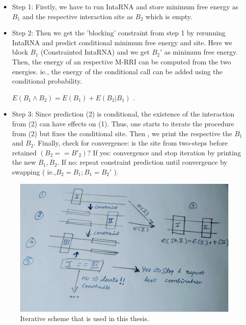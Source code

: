 \documentclass[twoside,a4paper]{report}
\begin{document}
	 
	 \begin{itemize}
	 	 
	
	 \item Step 1: Firstly, we have to run IntaRNA and store minimum free energy as $B_1$ and the respective interaction site as $B_2$ which is empty.
	 \item Step 2: Then we get the 'blocking' constraint from step 1 by rerunning IntaRNA and predict conditional minimum free energy and site. Here we block $B_1$ (Constrainted IntaRNA) and we get $B_2'$ as minimum free energy. Then, the energy of an respective M-RRI can be computed from the two energies. ie., the energy of the conditional call can be added using the conditional probability.\\
	 \begin{center}
	 	 $E(B_1 \land B_2) = E(B_1) + E(B_2 | B_1)$ .
	 \end{center}
	 
	 \item Step 3: Since prediction (2) is conditional, the existence of the interaction from (2) can have effects on (1). Thus, one starts to iterate the procedure from (2) but fixes the conditional site. Then , we print the respective the $B_1$ and $B_2$. Finally, check for convergence: is the site from two-steps before retained $(B_2 == B'_2)$? If yes: convergence and stop iteration by printing the new $B_1 , B_2$. If no: repeat constraint prediction until convergence by swapping ( ie.,$B_2 = B_1; B_1 = B_2'$ ).
	 
	  \end{itemize}
  
  	
  	 \begin{figure}[tb]
  		\includegraphics[width=0.9\linewidth]{idea}
  		\centering
  		\caption{ Iterative scheme that is used in this thesis.} 
  		\label{fig:idea}
 	 \end{figure}
  
\end{document}
